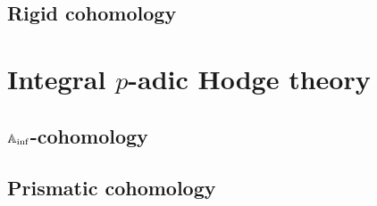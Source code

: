             
            
            
            
        \chapter{Rigid cohomology}
            \begin{abstract}
                
            \end{abstract}
            
            \minitoc
            
            
            
            
            
            
        
        
    \part{Integral \texorpdfstring{$p$}{}-adic Hodge theory}
        \chapter{\texorpdfstring{$\mathbb{A}_{\inf}$}{}-cohomology}
            \begin{abstract}
                
            \end{abstract}
            
            \minitoc
    
        \chapter{Prismatic cohomology}
            \begin{abstract}
                
            \end{abstract}
            
            \minitoc
            
            
            

